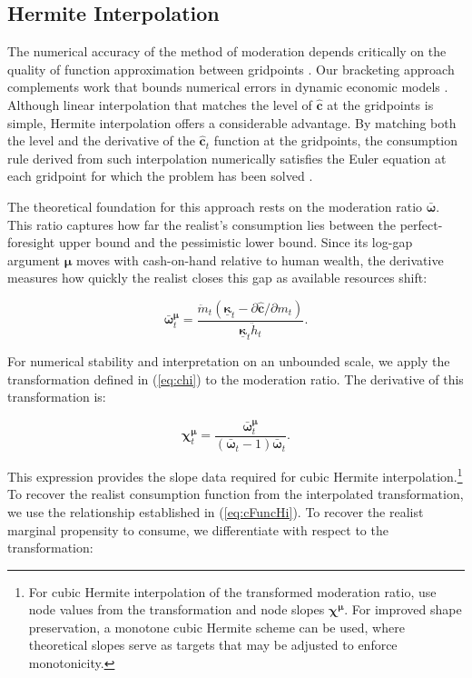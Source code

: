 \documentclass[twocolumn, switch]{article}
\newcommand{\mNrm}{m}
\newcommand{\cFunc}{\mathbf{c}}
\newcommand{\hNrm}{h}
\newcommand{\MPC}{\boldsymbol{\kappa}}
\newcommand{\MPCmin}{\underline{\MPC}}
\newcommand{\mNrmEx}{\ddot{\mNrm}}
\newcommand{\hNrmEx}{\ddot{\hNrm}}
\newcommand{\cFuncReal}{\hat{\cFunc}}
\newcommand{\modRte}{\boldsymbol{\bar{\omega}}}
\newcommand{\logmNrmEx}{\boldsymbol{\mu}}
\newcommand{\logitModRte}{\boldsymbol{\chi}}
\newcommand{\modRteMu}{\modRte^{\logmNrmEx}}
\newcommand{\logitModRteMu}{\logitModRte^{\logmNrmEx}}
\begin{document}
\subsection{Hermite Interpolation}

The numerical accuracy of the method of moderation depends critically on the quality of function approximation between gridpoints \citep{Santos2000}. Our bracketing approach complements work that bounds numerical errors in dynamic economic models \citep{JuddMaliarMaliar2017}. Although linear interpolation that matches the level of $\cFuncReal$ at the gridpoints is simple, Hermite interpolation \citep{Fritsch1980, FritschButland1984, Hyman1983} offers a considerable advantage. By matching both the level and the derivative of the $\cFuncReal_{t}$ function at the gridpoints, the consumption rule derived from such interpolation numerically satisfies the Euler equation at each gridpoint for which the problem has been solved \citep{BenvenisteScheinkman1979, MilgromSegal2002}.

The theoretical foundation for this approach rests on the moderation ratio $\modRte$. This ratio captures how far the realist's consumption lies between the perfect-foresight upper bound and the pessimistic lower bound. Since its log-gap argument $\logmNrmEx$ moves with cash-on-hand relative to human wealth, the derivative measures how quickly the realist closes this gap as available resources shift:

\begin{equation}
\label{eq:modRteMu}
\modRteMu_{t} = \frac{\mNrmEx_{t} (\MPCmin_{t} - \partial \cFuncReal/\partial \mNrm_{t})}{\MPCmin_{t} \hNrmEx_{t}}.
\end{equation}

For numerical stability and interpretation on an unbounded scale, we apply the transformation defined in (\ref{eq:chi}) to the moderation ratio. The derivative of this transformation is:

\begin{equation}
\label{eq:logitModRteMu}
\logitModRteMu_{t} = \frac{\modRteMu_{t}}{(\modRte_{t} - 1) \modRte_{t}}.
\end{equation}

This expression provides the slope data required for cubic Hermite interpolation.\footnote{For cubic Hermite interpolation of the transformed moderation ratio, use node values from the transformation and node slopes $\logitModRteMu$. For improved shape preservation, a monotone cubic Hermite scheme \citep{deBoor2001} can be used, where theoretical slopes serve as targets that may be adjusted to enforce monotonicity.} To recover the realist consumption function from the interpolated transformation, we use the relationship established in (\ref{eq:cFuncHi}). To recover the realist marginal propensity to consume, we differentiate with respect to the transformation:
\end{document}
